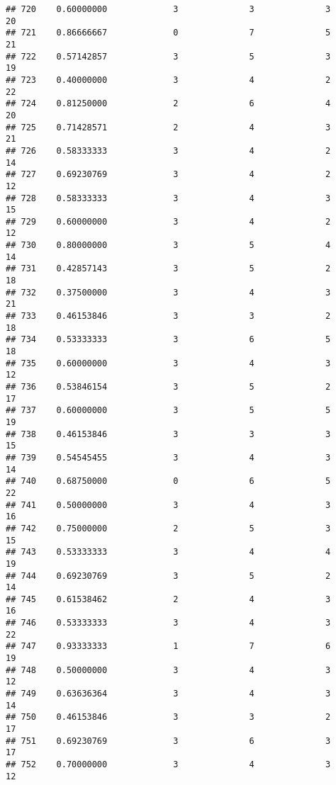 \documentclass[
]{article}
\begin{document}
\begin{verbatim}
## 720    0.60000000             3              3              3             20
## 721    0.86666667             0              7              5             21
## 722    0.57142857             3              5              3             19
## 723    0.40000000             3              4              2             22
## 724    0.81250000             2              6              4             20
## 725    0.71428571             2              4              3             21
## 726    0.58333333             3              4              2             14
## 727    0.69230769             3              4              2             12
## 728    0.58333333             3              4              3             15
## 729    0.60000000             3              4              2             12
## 730    0.80000000             3              5              4             14
## 731    0.42857143             3              5              2             18
## 732    0.37500000             3              4              3             21
## 733    0.46153846             3              3              2             18
## 734    0.53333333             3              6              5             18
## 735    0.60000000             3              4              3             12
## 736    0.53846154             3              5              2             17
## 737    0.60000000             3              5              5             19
## 738    0.46153846             3              3              3             15
## 739    0.54545455             3              4              3             14
## 740    0.68750000             0              6              5             22
## 741    0.50000000             3              4              3             16
## 742    0.75000000             2              5              3             15
## 743    0.53333333             3              4              4             19
## 744    0.69230769             3              5              2             14
## 745    0.61538462             2              4              3             16
## 746    0.53333333             3              4              3             22
## 747    0.93333333             1              7              6             19
## 748    0.50000000             3              4              3             12
## 749    0.63636364             3              4              3             14
## 750    0.46153846             3              3              2             17
## 751    0.69230769             3              6              3             17
## 752    0.70000000             3              4              3             12

\end{verbatim}
\end{document}

